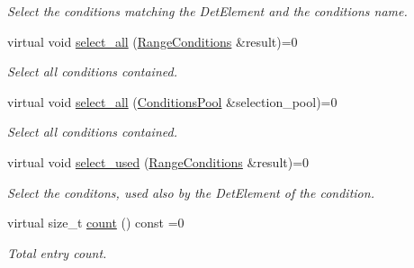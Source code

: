 \begin{DoxyCompactItemize}
\begin{DoxyCompactList}\small\item\em Select the conditions matching the Det\+Element and the conditions name. \end{DoxyCompactList}\item 
virtual void \hyperlink{class_d_d4hep_1_1_conditions_1_1_conditions_pool_ab8a4f19ff244225b1d46f6574aa832cb}{select\+\_\+all} (\hyperlink{namespace_d_d4hep_1_1_conditions_ae765f0140a33973a430280f02b6062f4}{Range\+Conditions} \&result)=0
\begin{DoxyCompactList}\small\item\em Select all conditions contained. \end{DoxyCompactList}\item 
virtual void \hyperlink{class_d_d4hep_1_1_conditions_1_1_conditions_pool_ac500caf2c66d0bad8523d83d569f969c}{select\+\_\+all} (\hyperlink{class_d_d4hep_1_1_conditions_1_1_conditions_pool}{Conditions\+Pool} \&selection\+\_\+pool)=0
\begin{DoxyCompactList}\small\item\em Select all conditions contained. \end{DoxyCompactList}\item 
virtual void \hyperlink{class_d_d4hep_1_1_conditions_1_1_conditions_pool_aab6927d2d318a4f16b8704423c6cdd7a}{select\+\_\+used} (\hyperlink{namespace_d_d4hep_1_1_conditions_ae765f0140a33973a430280f02b6062f4}{Range\+Conditions} \&result)=0
\begin{DoxyCompactList}\small\item\em Select the conditons, used also by the Det\+Element of the condition. \end{DoxyCompactList}\item 
virtual size\+\_\+t \hyperlink{class_d_d4hep_1_1_conditions_1_1_conditions_pool_a40326e9b162960c46e69cbdb451526d0}{count} () const =0
\begin{DoxyCompactList}\small\item\em Total entry count. \end{DoxyCompactList}\end{DoxyCompactItemize}

